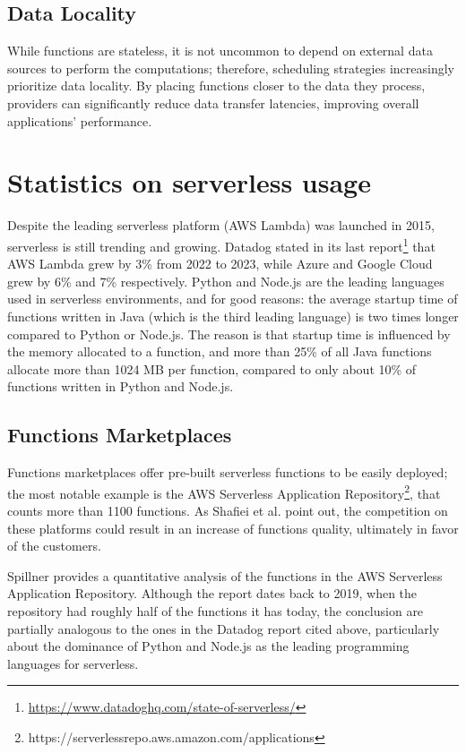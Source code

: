 \documentclass[
	a4paper, %
	12pt,
	twoside, %
]{LTJournalArticle}
\begin{document}
\subsection{Data Locality}
While functions are stateless, it is not uncommon to depend on external data sources to perform the computations; therefore, scheduling strategies increasingly prioritize data locality. By placing functions closer to the data they process, providers can significantly reduce data transfer latencies, improving overall applications' performance.

\section{Statistics on serverless usage}
Despite the leading serverless platform (AWS Lambda) was launched in 2015, serverless is still trending and growing. Datadog stated in its last report\footnote{\href{https://www.datadoghq.com/state-of-serverless/}{https://www.datadoghq.com/state-of-serverless/}} that AWS Lambda grew by 3\% from 2022 to 2023, while Azure and Google Cloud grew by 6\% and 7\% respectively. Python and Node.js are the leading languages used in serverless environments, and for good reasons: the average startup time of functions written in Java (which is the third leading language) is two times longer compared to Python or Node.js. The reason is that startup time is influenced by the memory allocated to a function, and more than 25\% of all Java functions allocate more than 1024 MB per function, compared to only about 10\% of functions written in Python and Node.js.

\subsection{Functions Marketplaces}
Functions marketplaces offer pre-built serverless functions to be easily deployed; the most notable example is the AWS Serverless Application Repository\footnote{https://serverlessrepo.aws.amazon.com/applications}, that counts more than 1100 functions. As Shafiei et al. \cite{shafiei_serverless_2022} point out, the competition on these platforms could result in an increase of functions quality, ultimately in favor of the customers. 

Spillner \cite{spillner_quantitative_2019} provides a quantitative analysis of the functions in the AWS Serverless Application Repository. Although the report dates back to 2019, when the repository had roughly half of the functions it has today, the conclusion are partially analogous to the ones in the Datadog report cited above, particularly about the dominance of Python and Node.js as the leading programming languages for serverless.
\end{document}
